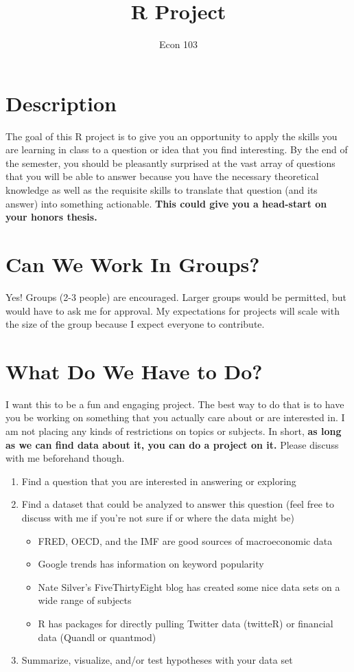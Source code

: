 \documentclass[10pt,letterpaper]{article}
\title{R Project}
\author{Econ 103}
\date{}
\begin{document}
\maketitle

\section{Description}
The goal of this R project is to give you an opportunity to apply the skills you are learning in class to a question or idea that you find interesting. By the end of the semester, you should be pleasantly surprised at the vast array of questions that you will be able to answer because you have the necessary theoretical knowledge as well as the requisite skills to translate that question (and its answer) into something actionable. \textbf{This could give you a head-start on your honors thesis.}

\section{Can We Work In Groups?}
Yes! Groups (2-3 people) are encouraged. Larger groups would be permitted, but would have to ask me for approval. My expectations for projects will scale with the size of the group because I expect everyone to contribute. 

\section{What Do We Have to Do?}
I want this to be a fun and engaging project. The best way to do that is to have you be working on something that you actually care about or are interested in. I am not placing any kinds of restrictions on topics or subjects. In short, \textbf{as long as we can find data about it, you can do a project on it. } Please discuss with me beforehand though. 

\begin{enumerate}
	\item Find a question that you are interested in answering or exploring
	\item Find a dataset that could be analyzed to answer this question (feel free to discuss with me if you're not sure if or where the data might be)
	\begin{itemize}
		\item FRED, OECD, and the IMF are good sources of macroeconomic data
		\item Google trends has information on keyword popularity
		\item Nate Silver's FiveThirtyEight blog has created some nice data sets on a wide range of subjects
		\item R has packages for directly pulling Twitter data (twitteR) or financial data (Quandl or quantmod)
	\end{itemize}
	\item Summarize, visualize, and/or test hypotheses with your data set
\end{enumerate}
\end{document}
